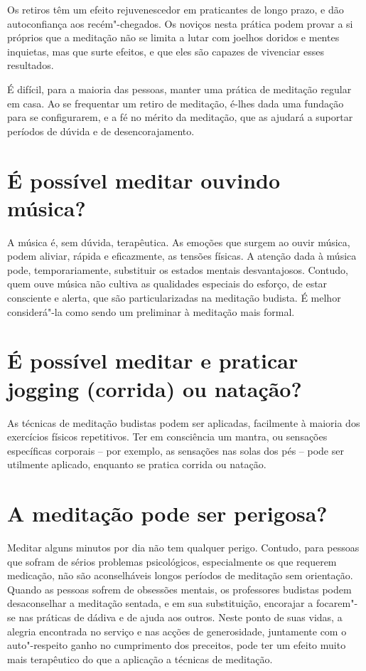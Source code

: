 Os retiros têm um efeito rejuvenescedor em praticantes de longo prazo, e
dão autoconfiança aos recém"-chegados. Os noviços nesta prática podem
provar a si próprios que a meditação não se limita a lutar com joelhos
doridos e mentes inquietas, mas que surte efeitos, e que eles são
capazes de vivenciar esses resultados.

É difícil, para a maioria das pessoas, manter uma prática de meditação
regular em casa. Ao se frequentar um retiro de meditação, é-lhes dada
uma fundação para se configurarem, e a fé no mérito da meditação, que as
ajudará a suportar períodos de dúvida e de desencorajamento.

\section{É possível meditar ouvindo música?}

A música é, sem dúvida, terapêutica. As emoções que surgem ao ouvir
música, podem aliviar, rápida e eficazmente, as tensões físicas. A
atenção dada à música pode, temporariamente, substituir os estados
mentais desvantajosos. Contudo, quem ouve música não cultiva as
qualidades especiais do esforço, de estar consciente e alerta, que são
particularizadas na meditação budista. É melhor considerá"-la como sendo
um preliminar à meditação mais formal.

\section{É possível meditar e praticar jogging (corrida) ou natação?}

As técnicas de meditação budistas podem ser aplicadas, facilmente à
maioria dos exercícios físicos repetitivos. Ter em consciência um
mantra, ou sensações específicas corporais -- por exemplo, as sensações
nas solas dos pés -- pode ser utilmente aplicado, enquanto se pratica
corrida ou natação.

\section{A meditação pode ser perigosa?}

Meditar alguns minutos por dia não tem qualquer perigo. Contudo, para
pessoas que sofram de sérios problemas psicológicos, especialmente os
que requerem medicação, não são aconselháveis longos períodos de
meditação sem orientação. Quando as pessoas sofrem de obsessões mentais,
os professores budistas podem desaconselhar a meditação sentada, e em
sua substituição, encorajar a focarem"-se nas práticas de dádiva e de
ajuda aos outros. Neste ponto de suas vidas, a alegria encontrada no
serviço e nas acções de generosidade, juntamente com o auto"-respeito
ganho no cumprimento dos preceitos, pode ter um efeito muito mais
terapêutico do que a aplicação a técnicas de meditação.

